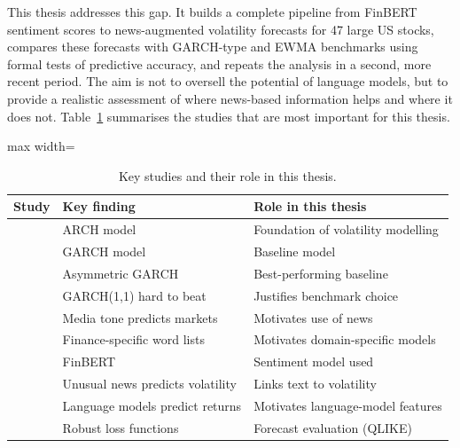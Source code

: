 This thesis addresses this gap. It builds a complete pipeline from FinBERT sentiment scores to news-augmented volatility forecasts for 47 large US stocks, compares these forecasts with GARCH-type and EWMA benchmarks using formal tests of predictive accuracy, and repeats the analysis in a second, more recent period. The aim is not to oversell the potential of language models, but to provide a realistic assessment of where news-based information helps and where it does not. Table~\ref{tab:literature} summarises the studies that are most important for this thesis.

\begin{table}[htbp]
  \centering\small
  \caption[Summary of key literature]{Key studies and their role in this thesis.}
  \label{tab:literature}
  \begin{adjustbox}{max width=\textwidth}
  \begin{tabular}{lll}
    \toprule
    Study & Key finding & Role in this thesis \\
    \midrule
    \textcite{engle1982} & ARCH model & Foundation of volatility modelling \\
    \textcite{bollerslev1986} & GARCH model & Baseline model \\
    \textcite{glosten1993} & Asymmetric GARCH & Best-performing baseline \\
    \textcite{hansen2005} & GARCH(1,1) hard to beat & Justifies benchmark choice \\
    \textcite{tetlock2007} & Media tone predicts markets & Motivates use of news \\
    \textcite{loughran2011} & Finance-specific word lists & Motivates domain-specific models \\
    \textcite{araci2019} & FinBERT & Sentiment model used \\
    \textcite{glasserman2019} & Unusual news predicts volatility & Links text to volatility \\
    \textcite{lopezlira2023} & Language models predict returns & Motivates language-model features \\
    \textcite{patton2011} & Robust loss functions & Forecast evaluation (QLIKE) \\
    \bottomrule
  \end{tabular}
  \end{adjustbox}
\end{table}
